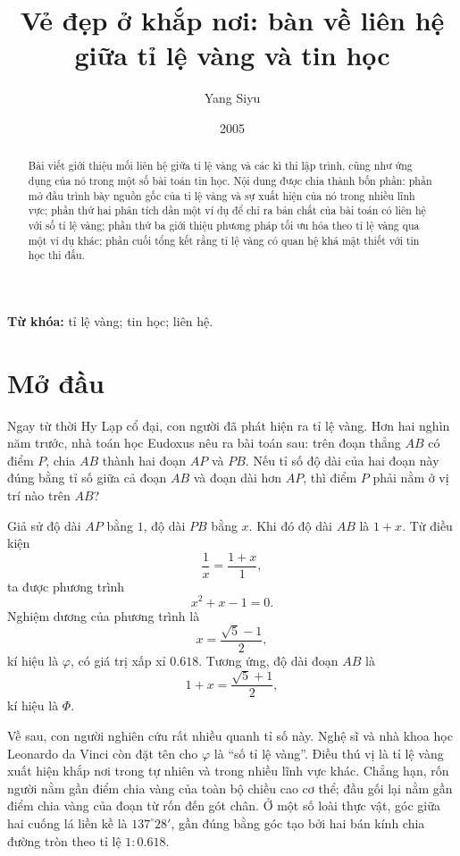 \documentclass[11pt]{article}
\title{Vẻ đẹp ở khắp nơi: bàn về liên hệ giữa tỉ lệ vàng và tin học}
\author{Yang Siyu}
\date{2005}
\begin{document}
\maketitle


\renewcommand{\abstractname}{Tóm tắt}
\begin{abstract}
Bài viết giới thiệu mối liên hệ giữa tỉ lệ vàng và các kì thi lập trình, cũng
như ứng dụng của nó trong một số bài toán tin học. Nội dung được chia thành
bốn phần: phần mở đầu trình bày nguồn gốc của tỉ lệ vàng và sự xuất hiện của
nó trong nhiều lĩnh vực; phần thứ hai phân tích dần một ví dụ để chỉ ra bản
chất của bài toán có liên hệ với số tỉ lệ vàng; phần thứ ba giới thiệu phương
pháp tối ưu hóa theo tỉ lệ vàng qua một ví dụ khác; phần cuối tổng kết rằng
tỉ lệ vàng có quan hệ khá mật thiết với tin học thi đấu.
\end{abstract}

\noindent\textbf{Từ khóa:} tỉ lệ vàng; tin học; liên hệ.

\section{Mở đầu}

Ngay từ thời Hy Lạp cổ đại, con người đã phát hiện ra tỉ lệ vàng. Hơn hai
nghìn năm trước, nhà toán học Eudoxus nêu ra bài toán sau: trên đoạn thẳng
\(AB\) có điểm \(P\), chia \(AB\) thành hai đoạn \(AP\) và \(PB\). Nếu tỉ số
độ dài của hai đoạn này đúng bằng tỉ số giữa cả đoạn \(AB\) và đoạn dài hơn
\(AP\), thì điểm \(P\) phải nằm ở vị trí nào trên \(AB\)?

Giả sử độ dài \(AP\) bằng \(1\), độ dài \(PB\) bằng \(x\). Khi đó độ dài
\(AB\) là \(1+x\). Từ điều kiện
\[
  \frac{1}{x}=\frac{1+x}{1},
\]
ta được phương trình
\[
  x^2+x-1=0.
\]
Nghiệm dương của phương trình là
\[
  x=\frac{\sqrt{5}-1}{2},
\]
kí hiệu là \(\varphi\), có giá trị xấp xỉ \(0.618\). Tương ứng, độ dài đoạn
\(AB\) là
\[
  1+x=\frac{\sqrt{5}+1}{2},
\]
kí hiệu là \(\Phi\).

Về sau, con người nghiên cứu rất nhiều quanh tỉ số này. Nghệ sĩ và nhà khoa
học Leonardo da Vinci còn đặt tên cho \(\varphi\) là ``số tỉ lệ vàng''. Điều
thú vị là tỉ lệ vàng xuất hiện khắp nơi trong tự nhiên và trong nhiều lĩnh
vực khác. Chẳng hạn, rốn người nằm gần điểm chia vàng của toàn bộ chiều cao
cơ thể; đầu gối lại nằm gần điểm chia vàng của đoạn từ rốn đến gót chân. Ở
một số loài thực vật, góc giữa hai cuống lá liền kề là \(137^\circ 28'\), gần
đúng bằng góc tạo bởi hai bán kính chia đường tròn theo tỉ lệ \(1:0.618\).
\end{document}
